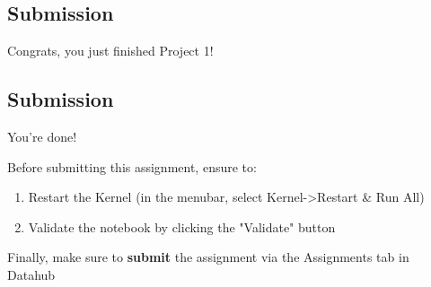 \documentclass[11pt]{article}
\providecommand{\tightlist}{%
      \setlength{\itemsep}{0pt}\setlength{\parskip}{0pt}}
\begin{document}
    \subsection{Submission}\label{submission}

Congrats, you just finished Project 1!

    \subsection{Submission}\label{submission}

You're done!

Before submitting this assignment, ensure to:

\begin{enumerate}
\def\labelenumi{\arabic{enumi}.}
\tightlist
\item
  Restart the Kernel (in the menubar, select
  Kernel-\textgreater{}Restart \& Run All)
\item
  Validate the notebook by clicking the "Validate" button
\end{enumerate}

Finally, make sure to \textbf{submit} the assignment via the Assignments
tab in Datahub


    
    
    
    
\end{document}
